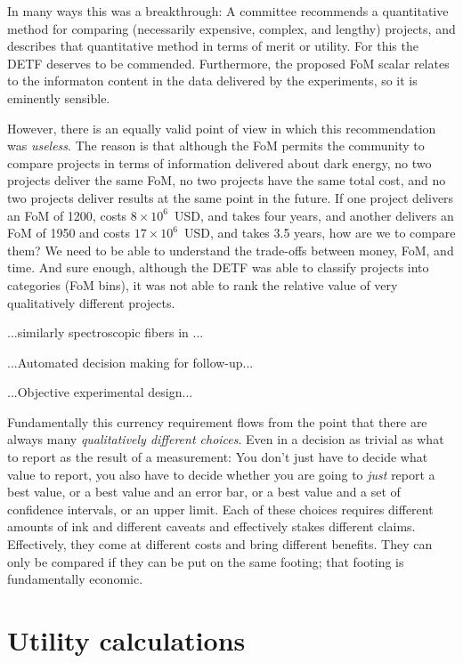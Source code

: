 \documentclass[12pt,twoside,pdftex]{article}
\begin{document}
In many ways this was a breakthrough: A committee recommends a
quantitative method for comparing (necessarily expensive, complex, and
lengthy) projects, and describes that quantitative method in terms of
merit or utility.  For this the DETF deserves to be commended.
Furthermore, the proposed FoM scalar relates to the informaton content
in the data delivered by the experiments, so it is eminently sensible.

However, there is an equally valid point of view in which this
recommendation was \emph{useless}.  The reason is that although the
FoM permits the community to compare projects in terms of information
delivered about dark energy, no two projects deliver the same FoM, no
two projects have the same total cost, and no two projects deliver
results at the same point in the future.  If one project delivers an
FoM of 1200, costs $8\times 10^6$~USD, and takes four years, and
another delivers an FoM of 1950 and costs $17\times 10^6$~USD, and
takes 3.5 years, how are we to compare them?  We need to be able to
understand the trade-offs between money, FoM, and time.  And sure
enough, although the DETF was able to classify projects into
categories (FoM bins), it was not able to rank the relative value of
very qualitatively different projects.

...similarly spectroscopic fibers in ...

...Automated decision making for follow-up...

...Objective experimental design...

Fundamentally this currency requirement flows from the point that
there are always many \emph{qualitatively different choices}.  Even in
a decision as trivial as what to report as the result of a
measurement: You don't just have to decide what value to report, you
also have to decide whether you are going to \emph{just} report a best
value, or a best value and an error bar, or a best value and a set of
confidence intervals, or an upper limit.  Each of these choices
requires different amounts of ink and different caveats and
effectively stakes different claims.  Effectively, they come at
different costs and bring different benefits.  They can only be
compared if they can be put on the same footing; that footing is
fundamentally economic.

\section{Utility calculations}
\end{document}
